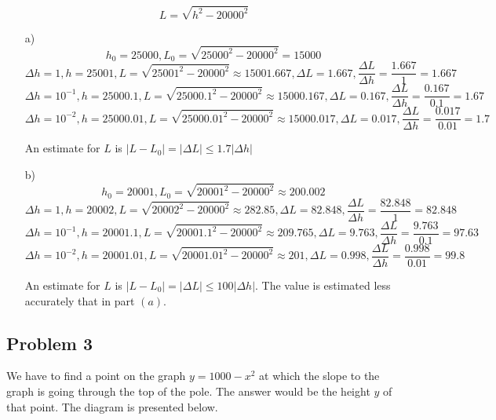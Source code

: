 \documentclass{article}
\begin{document}
\[L = \sqrt{h^2-20000^2}\]

\begin{itemize}
    \item[a)] 
\[h_0 = 25000, L_0 = \sqrt{25000^2-20000^2} = 15000\]
\[\Delta h = 1, h = 25001, L = \sqrt{25001^2-20000^2} \approx 15001.667, \Delta L = 1.667, \frac{\Delta L}{\Delta h} = \frac{1.667}{1} = 1.667\]
\[\Delta h = 10^{-1}, h = 25000.1, L = \sqrt{25000.1^2-20000^2} \approx 15000.167, \Delta L = 0.167, \frac{\Delta L}{\Delta h} = \frac{0.167}{0.1} = 1.67\]
\[\Delta h = 10^{-2}, h = 25000.01, L = \sqrt{25000.01^2-20000^2} \approx 15000.017, \Delta L = 0.017, \frac{\Delta L}{\Delta h} = \frac{0.017}{0.01} = 1.7\]

An estimate for $L$ is $|L-L_0| = |\Delta L| \leq 1.7|\Delta h|$

    \item[b)]
\[h_0 = 20001, L_0 = \sqrt{20001^2-20000^2} \approx 200.002\]
\[\Delta h = 1, h = 20002, L = \sqrt{20002^2-20000^2} \approx 282.85, \Delta L = 82.848, \frac{\Delta L}{\Delta h} = \frac{82.848}{1} = 82.848\]
\[\Delta h = 10^{-1}, h = 20001.1, L = \sqrt{20001.1^2-20000^2} \approx 209.765, \Delta L = 9.763, \frac{\Delta L}{\Delta h} = \frac{9.763}{0.1} = 97.63\]
\[\Delta h = 10^{-2}, h = 20001.01, L = \sqrt{20001.01^2-20000^2} \approx 201, \Delta L = 0.998, \frac{\Delta L}{\Delta h} = \frac{0.998}{0.01} = 99.8\]

An estimate for $L$ is $|L-L_0| = |\Delta L| \leq 100|\Delta h|$. The value is estimated less accurately that in part $(a)$.
\end{itemize}    
\subsection{Problem 3}

We have to find a point on the graph $y=1000-x^2$ at which the slope to the graph is going through the top of the pole. The answer would be the height $y$ of that point. The diagram is presented below.
\\
\\

\end{document}
